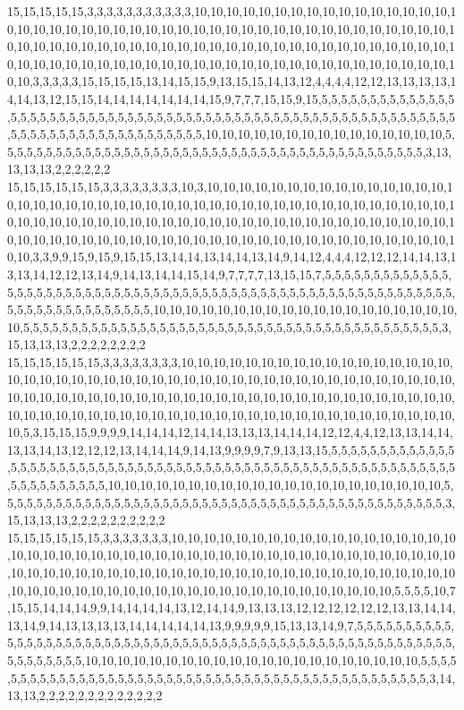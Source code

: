 15,15,15,15,15,3,3,3,3,3,3,3,3,3,3,3,10,10,10,10,10,10,10,10,10,10,10,10,10,10,10,10,10,10,10,10,10,10,10,10,10,10,10,10,10,10,10,10,10,10,10,10,10,10,10,10,10,10,10,10,10,10,10,10,10,10,10,10,10,10,10,10,10,10,10,10,10,10,10,10,10,10,10,10,10,10,10,10,10,10,10,10,10,10,10,10,10,10,10,10,10,10,10,10,10,10,10,10,10,10,10,10,10,10,10,10,10,10,3,3,3,3,3,15,15,15,15,13,14,15,15,9,13,15,15,14,13,12,4,4,4,4,12,12,13,13,13,13,14,14,13,12,15,15,14,14,14,14,14,14,14,15,9,7,7,7,15,15,9,15,5,5,5,5,5,5,5,5,5,5,5,5,5,5,5,5,5,5,5,5,5,5,5,5,5,5,5,5,5,5,5,5,5,5,5,5,5,5,5,5,5,5,5,5,5,5,5,5,5,5,5,5,5,5,5,5,5,5,5,5,5,5,5,5,5,5,5,5,5,5,5,5,5,5,5,5,5,5,5,5,10,10,10,10,10,10,10,10,10,10,10,10,10,10,10,5,5,5,5,5,5,5,5,5,5,5,5,5,5,5,5,5,5,5,5,5,5,5,5,5,5,5,5,5,5,5,5,5,5,5,5,5,5,5,5,5,5,5,5,3,13,13,13,13,2,2,2,2,2,2
15,15,15,15,15,15,3,3,3,3,3,3,3,3,10,3,10,10,10,10,10,10,10,10,10,10,10,10,10,10,10,10,10,10,10,10,10,10,10,10,10,10,10,10,10,10,10,10,10,10,10,10,10,10,10,10,10,10,10,10,10,10,10,10,10,10,10,10,10,10,10,10,10,10,10,10,10,10,10,10,10,10,10,10,10,10,10,10,10,10,10,10,10,10,10,10,10,10,10,10,10,10,10,10,10,10,10,10,10,10,10,10,10,10,10,10,10,3,3,9,9,15,9,15,9,15,15,13,14,14,13,14,14,13,14,9,14,12,4,4,4,12,12,12,14,14,13,13,13,14,12,12,13,14,9,14,13,14,14,15,14,9,7,7,7,7,13,15,15,7,5,5,5,5,5,5,5,5,5,5,5,5,5,5,5,5,5,5,5,5,5,5,5,5,5,5,5,5,5,5,5,5,5,5,5,5,5,5,5,5,5,5,5,5,5,5,5,5,5,5,5,5,5,5,5,5,5,5,5,5,5,5,5,5,5,5,5,5,5,5,5,5,5,5,10,10,10,10,10,10,10,10,10,10,10,10,10,10,10,10,10,10,10,10,5,5,5,5,5,5,5,5,5,5,5,5,5,5,5,5,5,5,5,5,5,5,5,5,5,5,5,5,5,5,5,5,5,5,5,5,5,5,5,5,5,5,5,3,15,13,13,13,2,2,2,2,2,2,2,2
15,15,15,15,15,15,3,3,3,3,3,3,3,3,10,10,10,10,10,10,10,10,10,10,10,10,10,10,10,10,10,10,10,10,10,10,10,10,10,10,10,10,10,10,10,10,10,10,10,10,10,10,10,10,10,10,10,10,10,10,10,10,10,10,10,10,10,10,10,10,10,10,10,10,10,10,10,10,10,10,10,10,10,10,10,10,10,10,10,10,10,10,10,10,10,10,10,10,10,10,10,10,10,10,10,10,10,10,10,10,10,10,10,10,10,10,5,3,15,15,15,9,9,9,9,14,14,14,12,14,14,13,13,13,14,14,14,12,12,4,4,12,13,13,14,14,13,13,14,13,12,12,12,13,14,14,14,9,14,13,9,9,9,9,7,9,13,13,15,5,5,5,5,5,5,5,5,5,5,5,5,5,5,5,5,5,5,5,5,5,5,5,5,5,5,5,5,5,5,5,5,5,5,5,5,5,5,5,5,5,5,5,5,5,5,5,5,5,5,5,5,5,5,5,5,5,5,5,5,5,5,5,5,5,5,5,5,5,10,10,10,10,10,10,10,10,10,10,10,10,10,10,10,10,10,10,10,10,10,5,5,5,5,5,5,5,5,5,5,5,5,5,5,5,5,5,5,5,5,5,5,5,5,5,5,5,5,5,5,5,5,5,5,5,5,5,5,5,5,5,5,5,5,5,5,3,15,13,13,13,2,2,2,2,2,2,2,2,2,2
15,15,15,15,15,15,3,3,3,3,3,3,3,10,10,10,10,10,10,10,10,10,10,10,10,10,10,10,10,10,10,10,10,10,10,10,10,10,10,10,10,10,10,10,10,10,10,10,10,10,10,10,10,10,10,10,10,10,10,10,10,10,10,10,10,10,10,10,10,10,10,10,10,10,10,10,10,10,10,10,10,10,10,10,10,10,10,10,10,10,10,10,10,10,10,10,10,10,10,10,10,10,10,10,10,10,10,10,10,10,10,5,5,5,5,10,7,15,15,14,14,14,9,9,14,14,14,14,13,12,14,14,9,13,13,13,12,12,12,12,12,12,13,13,14,14,13,14,9,14,13,13,13,13,14,14,14,14,14,13,9,9,9,9,9,15,13,13,14,9,7,5,5,5,5,5,5,5,5,5,5,5,5,5,5,5,5,5,5,5,5,5,5,5,5,5,5,5,5,5,5,5,5,5,5,5,5,5,5,5,5,5,5,5,5,5,5,5,5,5,5,5,5,5,5,5,5,5,5,5,5,5,5,5,5,10,10,10,10,10,10,10,10,10,10,10,10,10,10,10,10,10,10,10,10,10,5,5,5,5,5,5,5,5,5,5,5,5,5,5,5,5,5,5,5,5,5,5,5,5,5,5,5,5,5,5,5,5,5,5,5,5,5,5,5,5,5,5,5,5,5,5,5,3,14,13,13,2,2,2,2,2,2,2,2,2,2,2,2,2
